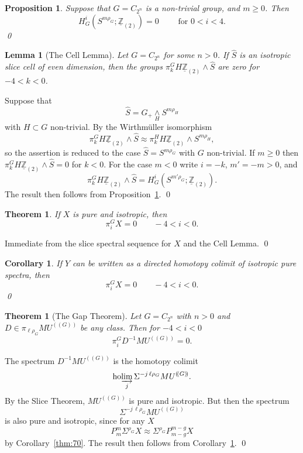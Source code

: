 \documentclass{amsart}
\newtheorem{thm}[equation]{Theorem}
\newtheorem{cor}[equation]{Corollary}
\newtheorem{lem}[equation]{Lemma}
\newtheorem{prop}[equation]{Proposition}
\theoremstyle{definition}
\theoremstyle{remark}
\newenvironment{pf}{\bigskip{\em Proof:\/}}{\qed\medskip}
\newcommand{\Z}{{\mathbb Z}}
\newcommand{\mutn}[1]{MU^{(\!(#1)\!)}}
\newcommand{\slc}[2]{P_{#1}^{#1}#2}
\DeclareMathOperator{\ho}{ho}
\newcommand{\smashove}[1]{\underset{#1}{\wedge}}
\newcommand{\zltm}{\underline{\Z}_{(2)}}
\newcommand{\hocolim}{\ho\!\varinjlim}
\newcommand{\ztn}{C_{2^{n}}}
\newcommand{\slicecell}{\widehat{S}}
\newcommand{\D}{D} %
\begin{document}
\begin{prop}
\label{thm:152}
Suppose that $G=\ztn$ is a non-trivial group, and $m\ge 0$.  Then
\[
H^{i}_{G}(S^{m\rho_{G}};\zltm) = 0 \qquad \text{ for }0< i<4.
\]
\qed
\end{prop}

\begin{lem}[The Cell Lemma] \label{thm:151} Let $G=\ztn$ for some
$n>0$.  If $\slicecell$ is an isotropic slice cell of even dimension,
then the groups $\pi^{G}_{k}H\zltm\wedge \slicecell$ are zero for
$-4<k<0$.
\end{lem}

\begin{pf}
Suppose that
\[
\slicecell=G_{+}\smashove{H}S^{m\rho_{H}}
\]
with $H\subset G$ non-trivial.  By the Wirthm\"uller isomorphism
\[
\pi^{G}_{k} H\zltm\wedge \slicecell \approx
\pi^{H}_{k}H\zltm\wedge S^{m\rho_{H}},
\]
so the assertion is reduced to the case $\slicecell=S^{m\rho_{G}}$ with $G$
non-trivial.  If $m\ge 0$ then $\pi^{G}_{k}H\zltm\wedge \slicecell=0$ for $k<0$.
For the case $m<0$ write $i=-k$,  $m'=-m>0$, and
\[
\pi^{G}_{k}H\zltm\wedge \slicecell = H^{i}_{G}(S^{m'\rho_{G}};\zltm).
\]
The result then follows from Proposition~\ref{thm:152}.
\end{pf}
 
\begin{thm}
\label{thm:153}
If $X$ is pure and isotropic, then
\[
\pi^{G}_{i}X=0\qquad -4<i<0.
\]
\end{thm}

\begin{pf}
Immediate from the slice spectral sequence for $X$ and the Cell Lemma.
\end{pf}

\begin{cor}
\label{thm:154} If $Y$ can be written as a directed homotopy colimit
of isotropic pure spectra, then
\[
\pi^{G}_{i}X=0\qquad -4<i<0.
\]
\qed
\end{cor}

\begin{thm}[The Gap Theorem]
\label{thm:155}
Let $G=\ztn$ with $n>0$ and $\D\in \pi_{\ell\rho_{G}}\mutn{G}$ be
any class.  Then for $-4<i<0$
\[
\pi^{G}_{i}\D^{-1}\mutn{G} = 0.
\]
\end{thm}

\begin{pf}
The spectrum $\D^{-1}\mutn{G}$ is the homotopy colimit
\[
\hocolim_{j} \Sigma^{-j\,\ell \rho_{G}} \mutn{G}.
\]
By the Slice Theorem, $\mutn{G}$ is pure and isotropic.  But then
the spectrum
\[
\Sigma^{-j\,\ell \rho_{G}} \mutn{G}
\]
is also pure and isotropic, since for any $X$
\[
\slc{m}{\Sigma^{\rho_{G}}X} \approx \Sigma^{\rho_{G}}\slc{m-g}{X}
\]
by Corollary~\ref{thm:70}.  The result then follows from
Corollary~\ref{thm:154}.
\end{pf}
\end{document}

